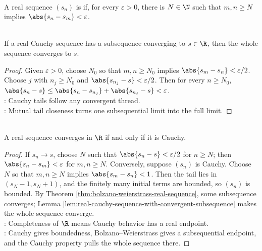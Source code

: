 \begin{definition} \label{def:real-cauchy-sequence} \\
A real sequence $(s_n)$ is  if, for every $\varepsilon>0$, there is $N\in\N$ such that $m,n\geq N$ implies $\abs{s_n-s_m}<\varepsilon$.
\end{definition}

\begin{lemma} \label{lem:real-cauchy-sequence-with-convergent-subsequence} \\
If a real Cauchy sequence has a subsequence converging to $s\in\R$, then the whole sequence converges to $s$.
\begin{proof}
Given $\varepsilon>0$, choose $N_0$ so that $m,n\geq N_0$ implies $\abs{s_m-s_n}<\varepsilon/2$. Choose $j$ with $n_j\geq N_0$ and $\abs{s_{n_j}-s}<\varepsilon/2$. Then for every $n\geq N_0$, $\abs{s_n-s}\leq\abs{s_n-s_{n_j}}+\abs{s_{n_j}-s}<\varepsilon$.\\
: Cauchy tails follow any convergent thread.\\
: Mutual tail closeness turns one subsequential limit into the full limit.
\end{proof}
\end{lemma}

\begin{theorem} \label{thm:real-cauchy-convergence-criterion} \\
A real sequence converges in $\R$ if and only if it is Cauchy.
\begin{proof}
If $s_n\to s$, choose $N$ such that $\abs{s_n-s}<\varepsilon/2$ for $n\geq N$; then $\abs{s_n-s_m}<\varepsilon$ for $m,n\geq N$. Conversely, suppose $(s_n)$ is Cauchy. Choose $N$ so that $m,n\geq N$ implies $\abs{s_m-s_n}<1$. Then the tail lies in $(s_N-1,s_N+1)$, and the finitely many initial terms are bounded, so $(s_n)$ is bounded. By Theorem \ref{thm:bolzano-weierstrass-real-sequence}, some subsequence converges; Lemma \ref{lem:real-cauchy-sequence-with-convergent-subsequence} makes the whole sequence converge.\\
: Completeness of $\R$ means Cauchy behavior has a real endpoint.\\
: Cauchy gives boundedness, Bolzano--Weierstrass gives a subsequential endpoint, and the Cauchy property pulls the whole sequence there.
\end{proof}
\end{theorem}

